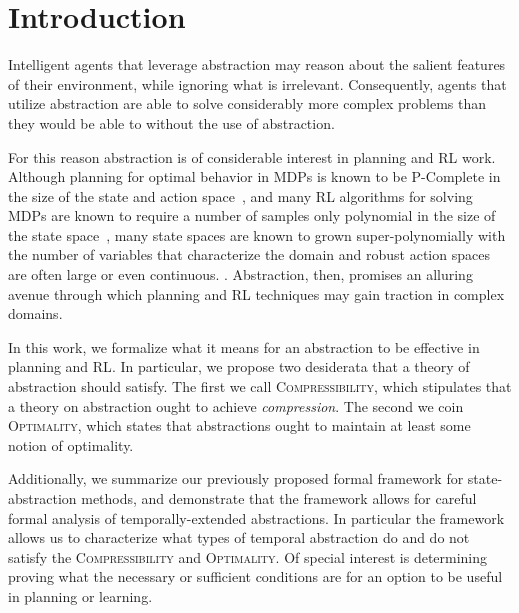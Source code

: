 \section{Introduction}
\label{sec:intro}

Intelligent agents that leverage abstraction may reason about the salient features of their environment, while ignoring what is irrelevant. Consequently, agents that utilize abstraction are able to solve considerably more complex problems than they would be able to without the use of abstraction. 

For this reason abstraction is of considerable interest in planning and \ac{RL} work.\cite{li2006towards,abelhershko2016approx,konidaris2007building,hauskrecht1998hierarchical,parr1998reinforcement,sutton1999between,konidaris2015constructing,Jiang2015,andre2002state} Although planning for optimal behavior in \acp{MDP} is known to be P-Complete in the size of the state and action space~\cite{papadimitriou1987complexity,littman1995complexity}, and many \ac{RL} algorithms for solving \acp{MDP} are known to require a number of samples only polynomial in the size of the state space~\cite{strehl2009reinforcement}, many state spaces are known to grown super-polynomially with the number of variables that characterize the domain \cite{abel2015goal} and robust action spaces are often large or even continuous. \cite{HARD LARGE CONTINOUS ACTION SPACE}. Abstraction, then, promises an alluring avenue through which planning and \ac{RL} techniques may gain traction in complex domains. 


In this work, we formalize what it means for an abstraction to be effective in planning and \ac{RL}. In particular, we propose  two desiderata that a theory of abstraction should satisfy. The first we call \textsc{Compressibility}, which stipulates that a theory on abstraction ought to achieve {\it compression}. The second we coin \textsc{Optimality}, which states that abstractions ought to maintain at least some notion of optimality.

Additionally, we summarize our previously proposed formal framework for state-abstraction methods, and demonstrate that the framework allows for careful formal analysis of temporally-extended abstractions. In particular the framework allows us to characterize what types of temporal abstraction do and do not satisfy the \textsc{Compressibility} and \textsc{Optimality}. Of special interest is determining proving what the necessary or sufficient conditions are for an option to be useful in planning or learning.


